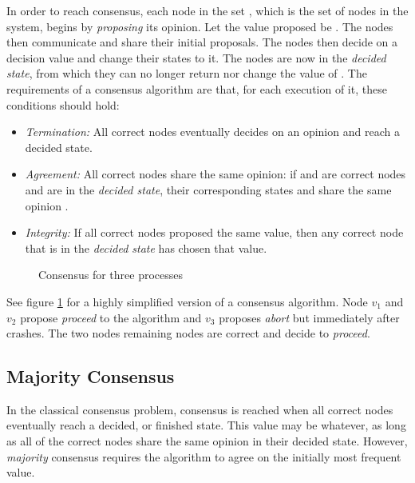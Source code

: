In order to reach consensus, each node in the set , which is the set of nodes in the system, begins by \emph{proposing} its opinion. Let the value proposed be . The nodes then communicate and share their initial proposals. The nodes then decide on a decision value  and change their states to it. The nodes are now in the \emph{decided state}, from which they can no longer return nor change the value of . The requirements of a consensus algorithm are that, for each execution of it, these conditions should hold:

\begin{itemize}[label={}]
  \item \emph{Termination:} All correct nodes eventually decides on an opinion and reach a decided state.
  \item \emph{Agreement:} All correct nodes share the same opinion: if  and  are correct nodes and are in the \emph{decided state}, their corresponding states  and  share the same opinion .
  \item \emph{Integrity:} If all correct nodes proposed the same value, then any correct node that is in the \emph{decided state} has chosen that value.
\end{itemize}


\begin{figure}[H]
    \centering
    
    \caption{Consensus for three processes}
    \label{fig:ConsensusProblem}
\end{figure}


See figure \ref{fig:ConsensusProblem} for a highly simplified version of a consensus algorithm. Node $v_1$ and $v_2$ propose \emph{proceed} to the algorithm and $v_3$ proposes \emph{abort} but immediately after crashes. The two nodes remaining nodes are correct and decide to \emph{proceed}.

\subsection{Majority Consensus}

In the classical consensus problem, consensus is reached when all correct nodes eventually reach a decided, or finished state. This value may be whatever, as long as all of the correct nodes share the same opinion in their decided state. However, \emph{majority} consensus requires the algorithm to agree on the initially most frequent value.

